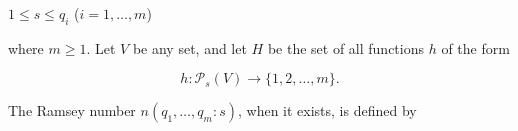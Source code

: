 $1 \leq s \leq q_i$ ($i = 1, \ldots, m$)

where $m \geq 1$. Let $V$ be any set, and let $H$ be the set of all functions $h$ of the form

$$h: \mathcal{P}_s(V) \rightarrow \{1, 2, \ldots, m\}.$$

The Ramsey number $n(q_1, \ldots, q_m: s)$, when it exists, is defined by
